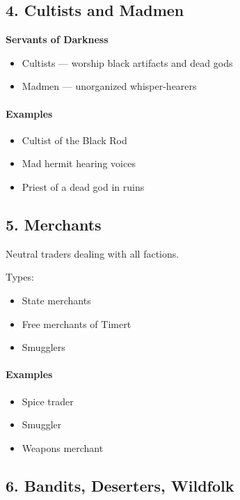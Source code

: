 \documentclass[a4paper,12pt]{article}
\begin{document}
\subsection{4. Cultists and Madmen}

\textbf{Servants of Darkness}

\begin{itemize}
\item Cultists — worship black artifacts and dead gods
\item Madmen — unorganized whisper-hearers
\end{itemize}

\paragraph{Examples}
\begin{itemize}
\item Cultist of the Black Rod
\item Mad hermit hearing voices
\item Priest of a dead god in ruins
\end{itemize}



\subsection{5. Merchants}

Neutral traders dealing with all factions.

Types:

\begin{itemize}
\item State merchants
\item Free merchants of Timert
\item Smugglers
\end{itemize}

\paragraph{Examples}
\begin{itemize}
\item Spice trader
\item Smuggler
\item Weapons merchant
\end{itemize}



\subsection{6. Bandits, Deserters, Wildfolk}
\end{document}
